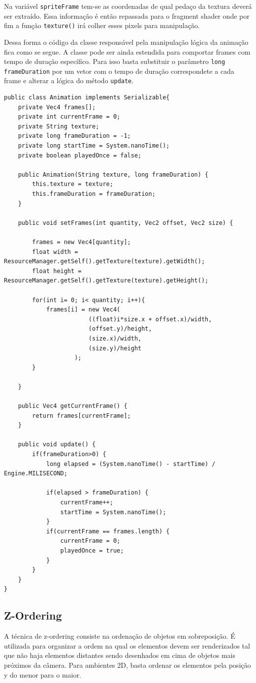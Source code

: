 \documentclass[12pt, 
openright, 
oneside, 
a4paper,    
brazil]{facom-ufu-abntex2}
\begin{document}
Na variável \texttt{spriteFrame}  tem-se as coordenadas de qual pedaço da textura deverá ser extraído. Essa informação é então repassada  para o fragment shader onde por fim a função \texttt{texture()} irá colher esses pixels para manipulação.

Dessa forma o código da classe responsável pela manipulação lógica da animação fica como se segue. A classe pode ser ainda estendida para comportar frames com tempo de duração específico. Para isso basta substituir o parâmetro \texttt{long frameDuration} por um vetor com o tempo de duração correspondete a cada frame e alterar a lógica do método \texttt{update}.

\begin{lstlisting}[caption=Classe Animation]
public class Animation implements Serializable{
	private Vec4 frames[];
	private int currentFrame = 0;
	private String texture;
	private long frameDuration = -1;
	private long startTime = System.nanoTime();
	private boolean playedOnce = false;
	
	public Animation(String texture, long frameDuration) {
		this.texture = texture;
		this.frameDuration = frameDuration;
	}

	public void setFrames(int quantity, Vec2 offset, Vec2 size) {
	
		frames = new Vec4[quantity];
		float width = ResourceManager.getSelf().getTexture(texture).getWidth();
		float height = ResourceManager.getSelf().getTexture(texture).getHeight();
		
		for(int i= 0; i< quantity; i++){
			frames[i] = new Vec4(
						((float)i*size.x + offset.x)/width,
						(offset.y)/height,
						(size.x)/width,
						(size.y)/height
					);
		}
		
	}
	
	public Vec4 getCurrentFrame() {
		return frames[currentFrame];
	}
	
	public void update() {
		if(frameDuration>0) {
			long elapsed = (System.nanoTime() - startTime) / Engine.MILISECOND;
			
			if(elapsed > frameDuration) {
				currentFrame++;
				startTime = System.nanoTime();
			}
			if(currentFrame == frames.length) {
				currentFrame = 0;
				playedOnce = true;
			}
		}
	}
}
\end{lstlisting}
\subsection{Z-Ordering}
A técnica de z-ordering consiste na ordenação de objetos em sobreposição. É utilizada para organizar a ordem na qual os elementos devem ser renderizados tal que não haja elementos distantes sendo desenhados em cima de objetos mais próximos da câmera.
Para ambientes 2D, basta ordenar os elementos pela posição y do menor para o maior. 
\end{document}
